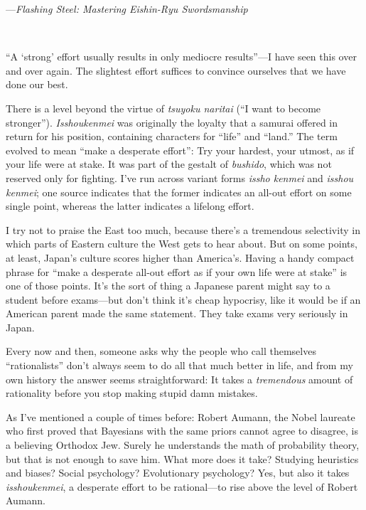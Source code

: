 {\raggedleft
 {}---\textit{Flashing Steel: Mastering Eishin-Ryu
Swordsmanship}
\par}


\bigskip

{
 ~}

{
 ``A `strong'
effort usually results in only mediocre results''---I
have seen this over and over again. The slightest effort suffices to
convince ourselves that we have done our best.}

{
 There is a level beyond the virtue of \textit{tsuyoku naritai}
(``I want to become stronger'').
\textit{Isshoukenmei} was originally the loyalty that a samurai offered
in return for his position, containing characters for
``life'' and
``land.'' The term evolved to mean
``make a desperate effort'': Try
your hardest, your utmost, as if your life were at stake. It was part
of the gestalt of \textit{bushido}, which was not reserved only for
fighting. I've run across variant forms \textit{issho
kenmei} and \textit{isshou kenmei}; one source indicates that the
former indicates an all-out effort on some single point, whereas the
latter indicates a lifelong effort.}

{
 I try not to praise the East too much, because
there's a tremendous selectivity in which parts of
Eastern culture the West gets to hear about. But on some points, at
least, Japan's culture scores higher than
America's. Having a handy compact phrase for
``make a desperate all-out effort as if your own life
were at stake'' is one of those points.
It's the sort of thing a Japanese parent might say to a
student before exams---but don't think
it's cheap hypocrisy, like it would be if an American
parent made the same statement. They take exams very seriously in
Japan.}

{
 Every now and then, someone asks why the people who call
themselves ``rationalists''
don't always seem to do all that much better in life,
and from my own history the answer seems straightforward: It takes a
\textit{tremendous} amount of rationality before you stop making stupid
damn mistakes.}

{
 As I've mentioned a couple of times before: Robert
Aumann, the Nobel laureate who first proved that Bayesians with the
same priors cannot agree to disagree, is a believing Orthodox Jew.
Surely he understands the math of probability theory, but that is not
enough to save him. What more does it take? Studying heuristics and
biases? Social psychology? Evolutionary psychology? Yes, but also it
takes \textit{isshoukenmei}, a desperate effort to be rational---to
rise above the level of Robert Aumann.}

